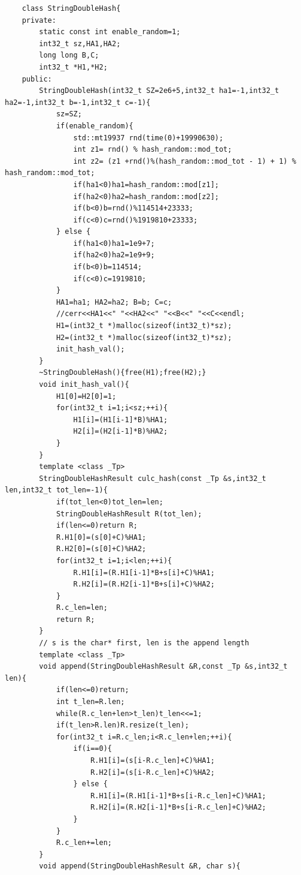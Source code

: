 \documentclass[twoside]{article}
\begin{document}
\begin{lstlisting}
    class StringDoubleHash{
    private:
        static const int enable_random=1;
        int32_t sz,HA1,HA2;
        long long B,C;
        int32_t *H1,*H2;
    public:
        StringDoubleHash(int32_t SZ=2e6+5,int32_t ha1=-1,int32_t ha2=-1,int32_t b=-1,int32_t c=-1){
            sz=SZ;
            if(enable_random){
                std::mt19937 rnd(time(0)+19990630);
                int z1= rnd() % hash_random::mod_tot;
                int z2= (z1 +rnd()%(hash_random::mod_tot - 1) + 1) % hash_random::mod_tot;
                if(ha1<0)ha1=hash_random::mod[z1];
                if(ha2<0)ha2=hash_random::mod[z2];
                if(b<0)b=rnd()%114514+23333;
                if(c<0)c=rnd()%1919810+23333;
            } else {
                if(ha1<0)ha1=1e9+7;
                if(ha2<0)ha2=1e9+9;
                if(b<0)b=114514;
                if(c<0)c=1919810;
            }
            HA1=ha1; HA2=ha2; B=b; C=c;
            //cerr<<HA1<<" "<<HA2<<" "<<B<<" "<<C<<endl;
            H1=(int32_t *)malloc(sizeof(int32_t)*sz);
            H2=(int32_t *)malloc(sizeof(int32_t)*sz);
            init_hash_val();
        }
        ~StringDoubleHash(){free(H1);free(H2);}
        void init_hash_val(){
            H1[0]=H2[0]=1;
            for(int32_t i=1;i<sz;++i){
                H1[i]=(H1[i-1]*B)%HA1;
                H2[i]=(H2[i-1]*B)%HA2;
            }
        }
        template <class _Tp>
        StringDoubleHashResult culc_hash(const _Tp &s,int32_t len,int32_t tot_len=-1){
            if(tot_len<0)tot_len=len;
            StringDoubleHashResult R(tot_len);
            if(len<=0)return R;
            R.H1[0]=(s[0]+C)%HA1;
            R.H2[0]=(s[0]+C)%HA2;
            for(int32_t i=1;i<len;++i){
                R.H1[i]=(R.H1[i-1]*B+s[i]+C)%HA1;
                R.H2[i]=(R.H2[i-1]*B+s[i]+C)%HA2;
            }
            R.c_len=len;
            return R;
        }
        // s is the char* first, len is the append length
        template <class _Tp>
        void append(StringDoubleHashResult &R,const _Tp &s,int32_t len){
            if(len<=0)return;
            int t_len=R.len;
            while(R.c_len+len>t_len)t_len<<=1;
            if(t_len>R.len)R.resize(t_len);
            for(int32_t i=R.c_len;i<R.c_len+len;++i){
                if(i==0){
                    R.H1[i]=(s[i-R.c_len]+C)%HA1;
                    R.H2[i]=(s[i-R.c_len]+C)%HA2;
                } else {
                    R.H1[i]=(R.H1[i-1]*B+s[i-R.c_len]+C)%HA1;
                    R.H2[i]=(R.H2[i-1]*B+s[i-R.c_len]+C)%HA2;
                }
            }
            R.c_len+=len;
        }
        void append(StringDoubleHashResult &R, char s){

\end{lstlisting}
\end{document}
